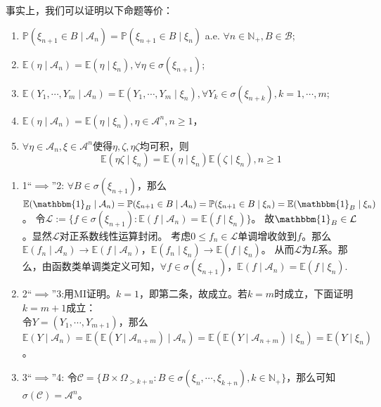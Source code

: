 \documentclass{ctexart}
\begin{document}
\begin{solution}
  事实上，我们可以证明以下命题等价：
  \begin{enumerate}
    \item \(\mathbb{P}(\xi_{n + 1} \in B \mid \mathcal{A}_n)=\mathbb{P}(\xi_{n + 1} \in B \mid \xi_n) \) a.e. \(\forall n \in \mathbb{N}_{+}, B \in \mathcal{B} \);
    \item \(\mathbb{E}(\eta \mid \mathcal{A}_n )= \mathbb{E}(\eta \mid \xi_n),\forall \eta \in \sigma(\xi_{n + 1}) \);
    \item \(\mathbb{E}(Y_1,\cdots,Y_m \mid \mathcal{A}_n)=\mathbb{E}(Y_1,\cdots,Y_m \mid \xi_n),\forall Y_k \in \sigma(\xi_{n + k}),k =1,\cdots,m \);
    \item \(\mathbb{E}(\eta \mid \mathcal{A}_n)=\mathbb{E}(\eta \mid \xi_n),\eta \in \mathcal{A}^n, n \geq 1 \)，
    \item \(\forall \eta \in \mathcal{A}_n,\xi \in \mathcal{A}^n \)使得\(\eta , \zeta ,\eta \zeta \)均可积，则\[
        \mathbb{E}(\eta \zeta \mid \xi_n)=\mathbb{E}(\eta \mid \xi_n)\mathbb{E}(\zeta \mid \xi_n),n \geq 1
      \]
  \end{enumerate}
  \begin{enumerate}
    \item 1``\(\implies\)''2: \(\forall B \in \sigma(\xi_{n + 1}) \)，那么\(\mathbb{E}(\mathbbm{1}_B \mid \mathcal{A}_n)=\mathbb{P}(\xi_{n + 1} \in B \mid \mathcal{A}_n)=\mathbb{P}(\xi_{n + 1} \in B \mid \xi_n)=\mathbb{E}(\mathbbm{1}_B \mid \xi_n) \)。
      令\(\mathcal{L}:=\{f \in \sigma(\xi_{n + 1}): \mathbb{E}(f \mid \mathcal{A}_n)=\mathbb{E}(f \mid \xi_n)\} \)。
      故\(\mathbbm{1}_{B} \in \mathcal{L} \)。显然\(\mathcal{L} \)对正系数线性运算封闭。
      考虑\(0 \leq f_n \in \mathcal{L} \)单调增收敛到\(f \)。那么\(\mathbb{E}(f_n \mid \mathcal{A}_n) \to \mathbb{E}(f \mid \mathcal{A}_n) \)，\(\mathbb{E}(f_n \mid \xi_n) \to \mathbb{E}(f \mid \xi_n) \)。
      从而\(\mathcal{L} \)为\(L \)系。那么，由函数类单调类定义可知，\(\forall f \in \sigma(\xi_{n + 1}) \)，\(\mathbb{E}(f \mid \mathcal{A}_n)=\mathbb{E}(f \mid \xi_n) \).
    \item 2``\(\implies\)''3:用MI证明。\(k=1 \)，即第二条，故成立。若\( k=m\)时成立，下面证明\(k=m + 1 \)成立：\\
      令\(Y=(Y_1,\cdots,Y_{m + 1}) \)，那么\(\mathbb{E}(Y \mid \mathcal{A}_n)=\mathbb{E}(\mathbb{E}(Y \mid \mathcal{A}_{n + m }) \mid \mathcal{A}_n)=\mathbb{E}(\mathbb{E}(Y \mid \mathcal{A}_{n + m})\mid \xi_n)=\mathbb{E}(Y  \mid \xi_n) \)。
    \item 3``\(\implies\)''4: 令\(\mathcal{C}=\{B \times \Omega_{> k + n}: B \in \sigma(\xi_n,\cdots,\xi_{k + n}), k \in \mathbb{N}_{+}\} \)，那么可知\(\sigma(\mathcal{C})=\mathcal{A}^n \)。

\end{enumerate}
\end{solution}
\end{document}
